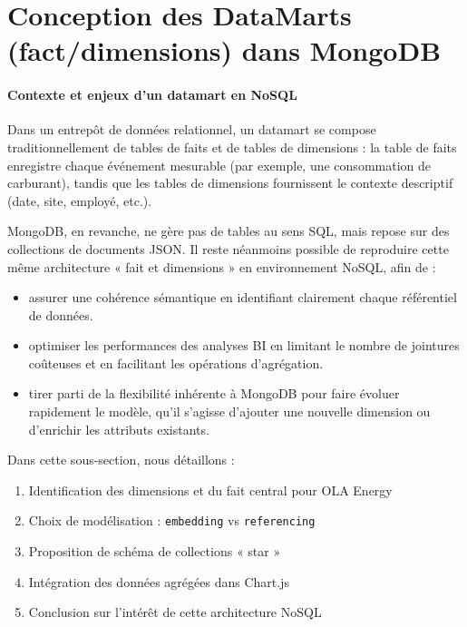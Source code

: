\documentclass[a4paper,11pt]{report}
\begin{document}
\section{Conception des DataMarts (fact/dimensions) dans MongoDB}

\paragraph{Contexte et enjeux d’un datamart en NoSQL\\}
Dans un entrepôt de données relationnel, un datamart se compose traditionnellement de tables de faits et de tables de dimensions : la table de faits enregistre chaque événement mesurable (par exemple, une consommation de carburant), tandis que les tables de dimensions fournissent le contexte descriptif (date, site, employé, etc.).

MongoDB, en revanche, ne gère pas de tables au sens SQL, mais repose sur des collections de documents JSON. Il reste néanmoins possible de reproduire cette même architecture « fait et dimensions » en environnement NoSQL, afin de :
\begin{itemize}[leftmargin=*]
\item assurer une cohérence sémantique en identifiant clairement chaque référentiel de données.
\item optimiser les performances des analyses BI en limitant le nombre de jointures coûteuses et en facilitant les opérations d’agrégation.
\item tirer parti de la flexibilité inhérente à MongoDB pour faire évoluer rapidement le modèle, qu’il s’agisse d’ajouter une nouvelle dimension ou d’enrichir les attributs existants.
\end{itemize}


Dans cette sous-section, nous détaillons :
\begin{enumerate}[label=\alph*., leftmargin=*]
  \item Identification des dimensions et du fait central pour OLA Energy
  \item Choix de modélisation : \texttt{embedding} vs \texttt{referencing}
  \item Proposition de schéma de collections « star »
  \item Intégration des données agrégées dans Chart.js
  \item Conclusion sur l’intérêt de cette architecture NoSQL
\end{enumerate}

\vspace{0.5em}
\end{document}
